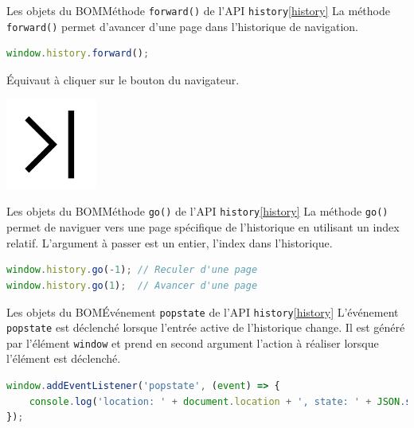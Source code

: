 \documentclass{beamer}
\begin{document}
    \begin{frame}[fragile]{Les objets du BOM}{Méthode \lstinline{forward()} de l'API \lstinline{history}\cref{history}}
        La méthode \lstinline{forward()} permet d'avancer d'une page dans l'historique de navigation.
        \begin{lstlisting}[language=JavaScript,title={\tiny{Script JavaScript}}]
window.history.forward();
        \end{lstlisting}
        Équivaut à cliquer sur le bouton  du navigateur.
        \begin{center}
            \includegraphics[width=3cm]{image/page-last}
        \end{center}
    \end{frame}

    \begin{frame}[fragile]{Les objets du BOM}{Méthode \lstinline{go()} de l'API \lstinline{history}\cref{history}}
        La méthode \lstinline{go()} permet de naviguer vers une page spécifique de l'historique en utilisant un index relatif.
        L'argument à passer est un entier, l'index dans l'historique.
        \begin{lstlisting}[language=JavaScript,title={\tiny{Script JavaScript}}]
window.history.go(-1); // Reculer d'une page
window.history.go(1);  // Avancer d'une page
        \end{lstlisting}
    \end{frame}

    \begin{frame}[fragile]{Les objets du BOM}{Événement \lstinline{popstate} de l'API \lstinline{history}\cref{history}}
        L'événement \lstinline{popstate} est déclenché lorsque l'entrée active de l'historique change.
        Il est généré par l'élément \lstinline{window} et prend en second argument l'action à réaliser lorsque l'élément est déclenché.
        \begin{lstlisting}[language=JavaScript,title={\tiny{Script JavaScript}}]
window.addEventListener('popstate', (event) => {
    console.log('location: ' + document.location + ', state: ' + JSON.stringify(event.state));
});
        \end{lstlisting}
    \end{frame}
\end{document}
